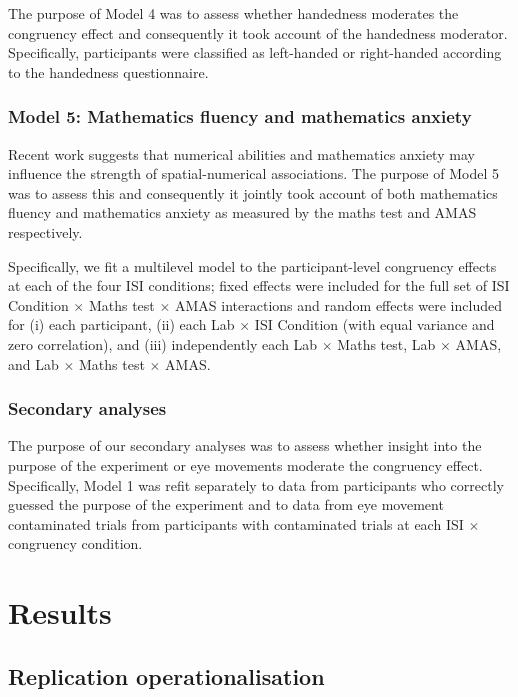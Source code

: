 \documentclass[A4paper,man,floatsintext]{apa6}
\theoremstyle{definition}
\theoremstyle{definition}
\theoremstyle{definition}
\theoremstyle{remark}
\begin{document}
The purpose of Model 4 was to assess whether handedness moderates the
congruency effect and consequently it took account of the handedness
moderator. Specifically, participants were classified as left-handed or
right-handed according to the handedness questionnaire.

\subsubsection{Model 5: Mathematics fluency and mathematics
anxiety}\label{model-5-mathematics-fluency-and-mathematics-anxiety}

Recent work suggests that numerical abilities \autocite{Fischer:2006er}
and mathematics anxiety \autocite{Georges:2016gn} may influence the
strength of spatial-numerical associations. The purpose of Model 5 was
to assess this and consequently it jointly took account of both
mathematics fluency and mathematics anxiety as measured by the maths
test and AMAS respectively.

Specifically, we fit a multilevel model to the participant-level
congruency effects at each of the four ISI conditions; fixed effects
were included for the full set of ISI Condition \(\times\) Maths test
\(\times\) AMAS interactions and random effects were included for (i)
each participant, (ii) each Lab \(\times\) ISI Condition (with equal
variance and zero correlation), and (iii) independently each Lab
\(\times\) Maths test, Lab \(\times\) AMAS, and Lab \(\times\) Maths
test \(\times\) AMAS.

\subsubsection{Secondary analyses}\label{secondary-analyses}

The purpose of our secondary analyses was to assess whether insight into
the purpose of the experiment or eye movements moderate the congruency
effect. Specifically, Model 1 was refit separately to data from
participants who correctly guessed the purpose of the experiment and to
data from eye movement contaminated trials from participants with
contaminated trials at each ISI \(\times\) congruency condition.

\section{Results}\label{results}

\subsection{Replication
operationalisation}\label{replication-operationalisation}
\end{document}
